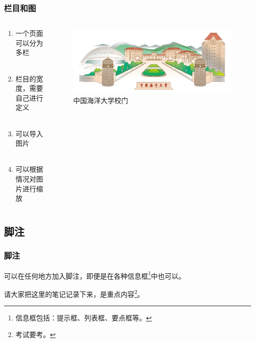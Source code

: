 \documentclass[aspectratio=169,UTF8,t]{beamer}%
\begin{document}
\begin{frame}
    \frametitle{栏目和图}

    \begin{columns}
        \begin{column}{0.4\textwidth}
            \begin{enumerate}
                \item 一个页面可以分为多栏\\~
                \item 栏目的宽度，需要自己进行定义\\~
                \item 可以导入图片\\~
                \item 可以根据情况对图片进行缩放
            \end{enumerate}
        \end{column}
        \begin{column}{0.4\textwidth}
            \centering
            \begin{figure}
                \centering
                \includegraphics[width=\textwidth]{figs/ouc_gate.png}
                    \caption{中国海洋大学校门}
                    \label{fig1}
            \end{figure}
            
        \end{column}
    \end{columns}
\end{frame}

\subsection{脚注}

\begin{frame}
    \frametitle{脚注}
        可以在任何地方加入脚注，即便是在各种信息框\footnote{信息框包括：提示框、列表框、要点框等。}中也可以。
        \begin{notebox}[笔记]
            请大家把这里的笔记记录下来，是重点内容\footnote{考试要考。}。 
        \end{notebox}
\end{frame}

\makelast
\end{document}
